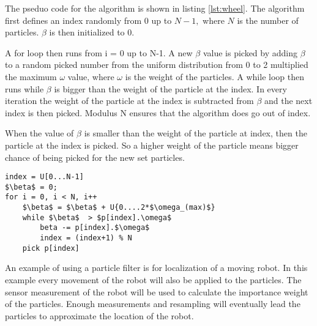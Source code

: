 \FloatBarrier
The pseduo code for the algorithm is shown in listing \ref{lst:wheel}. The algorithm first defines an index randomly from 0 up to $N-1,$ where $N$ is the number of particles. $\beta$ is then initialized to 0. 

A for loop then runs from i = 0 up to N-1. A new $\beta$ value is picked by adding $\beta$ to a random picked number from the uniform distribution from 0 to 2 multiplied the maximum $\omega$ value, where $\omega$ is the weight of the particles. A while loop then runs while $\beta$ is bigger than the weight of the particle at the index. In every iteration the weight of the particle at the index is subtracted from $\beta$ and the next index is then picked. Modulus N ensures that the algorithm does go out of index. 

When the value of $\beta$ is smaller than the weight of the particle at index, then the particle at the index is picked. So a higher weight of the particle means bigger chance of being picked for the new set particles. 

\begin{lstlisting}[caption={Pesudo code for the resampling wheel}, label=lst:wheel, mathescape=true]
index = U[0...N-1]
$\beta$ = 0;
for i = 0, i < N, i++
	$\beta$ = $\beta$ + U{0....2*$\omega_(max)$}
	while $\beta$  > $p[index].\omega$ 
		beta -= p[index].$\omega$
		index = (index+1) % N
	pick p[index]
\end{lstlisting}

An example of using a particle filter is for localization of a moving robot. In this example every movement of the robot will also be applied to the particles. The sensor measurement of the robot will be used to calculate the importance weight of the particles. Enough measurements and resampling will eventually lead the particles to approximate the location of the robot.


